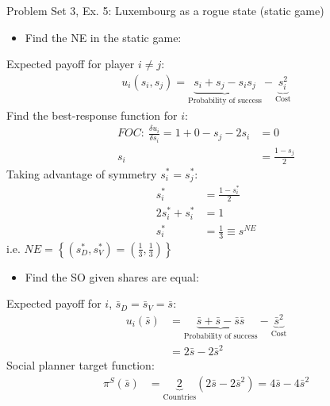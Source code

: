 \begin{frame}{Problem Set 3, Ex. 5: Luxembourg as a rogue state (static game)}
  \begin{multicols}{2}
    \begin{itemize}
      \item[(a)] Find the NE in the static game:
    \end{itemize}
    Expected payoff for player $i\neq j$:
    \begin{align*}
      u_i(s_i,s_j)=\underbrace{s_i+s_j-s_is_j}_\text{Probability of success}-\underbrace{s_i^2}_\text{Cost}
    \end{align*}
    Find the best-response function for $i$:
    \begin{align*}
      FOC:\ \frac{\delta u_i}{\delta s_i}=1+0-s_j-2s_i&=0\\
       s_i&=\frac{1-s_j}{2}
    \end{align*}
    Taking advantage of symmetry $s_i^{*}=s_j^{*}$:
    \begin{align*}
       s_i^{*}&=\frac{1-s_i^{*}}{2}\\
      2s_i^{*}+s_i^{*}&=1\\
       s_i^{*}&=\frac{1}{3}\equiv s^{NE}
    \end{align*}
    i.e. $NE=\left\{(s_D^{*},s_V^{*})=(\frac{1}{3},\frac{1}{3})\right\}$
  \vfill\null\columnbreak
    \begin{itemize}
      \item[(b)] Find the SO given shares are equal:
    \end{itemize}
    Expected payoff for $i$, $\bar{s}_D=\bar{s}_V=\bar{s}$:
    \begin{align*}
      u_i(\bar{s})&=\underbrace{\bar{s}+\bar{s}-\bar{s}\bar{s}}_\text{Probability of success}-\underbrace{\bar{s}^2}_\text{Cost}\\
                  &=2\bar{s}-2\bar{s}^2
    \end{align*}
    Social planner target function:
    \begin{align*}
      \pi^S(\bar{s})&=\underbrace{2}_\text{Countries}(2\bar{s}-2\bar{s}^2)=4\bar{s}-4\bar{s}^2
    \end{align*}
  \vfill\null
  \end{multicols}
\end{frame}
